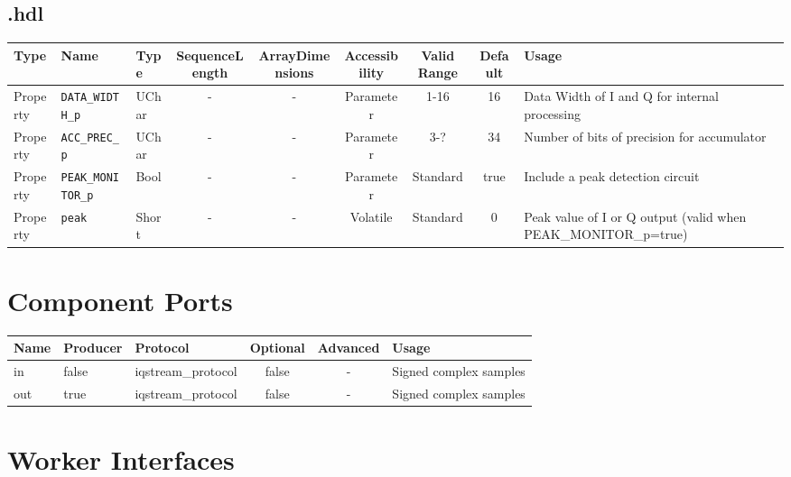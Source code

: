 \begin{landscape}
\subsection*{\comp.hdl}
	\begin{scriptsize}
		\begin{tabular}{|p{3cm}|p{2cm}|p{1cm}|c|c|c|c|c|p{5cm}|}
			\hline
			\rowcolor{blue}
			Type     & Name                  & Type  & SequenceLength & ArrayDimensions & Accessibility       & Valid Range & Default & Usage                                        \\
			\hline
			Property & \verb+DATA_WIDTH_p+   & UChar & -              & -               & Parameter & 1-16        & 16      & Data Width of I and Q for internal processing\\
			\hline
			Property & \verb+ACC_PREC_p+     & UChar & -              & -               & Parameter & 3-?         & 34      & Number of bits of precision for accumulator\\
			\hline
			Property & \verb+PEAK_MONITOR_p+ & Bool  & -              & -               & Parameter & Standard    & true    &
			Include a peak detection circuit\\
			\hline
			Property & \verb+peak+           & Short & -              & -               & Volatile            & Standard    & 0       &
			Peak value of I or Q output (valid when PEAK\_MONITOR\_p=true)\\
			\hline
		\end{tabular}
	\end{scriptsize}

\section*{Component Ports}
\begin{scriptsize}
	\begin{tabular}{|M{2cm}|M{1.5cm}|M{4cm}|c|c|M{9cm}|}
		\hline
		\rowcolor{blue}
		Name & Producer & Protocol           & Optional & Advanced & Usage                  \\
		\hline
		in   & false    & iqstream\_protocol & false    & -        & Signed complex samples \\
		\hline
		out  & true     & iqstream\_protocol & false    & -        & Signed complex samples \\
		\hline
	\end{tabular}
\end{scriptsize}

\section*{Worker Interfaces}

\end{landscape}
